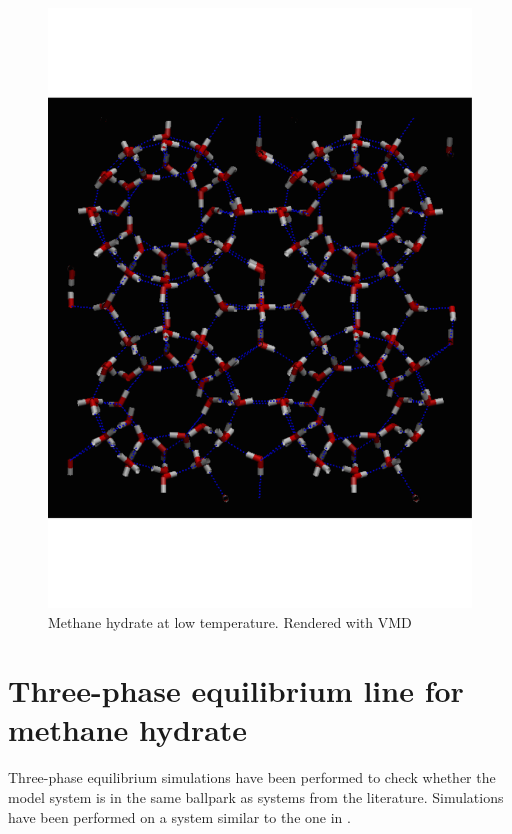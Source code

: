 \begin{figure}
\includegraphics[width=\textwidth]{../snapshots/first_stable_hydrate.pdf}
\caption{Methane hydrate at low temperature. Rendered with VMD}
\label{fig:part2:first_hydrate}
\end{figure}

\section{Three-phase equilibrium line for methane hydrate}
Three-phase equilibrium simulations have been performed to check whether the model system is in the same ballpark as systems from the literature. Simulations have been performed on a system similar to the one in \cite{Conde2010}.


